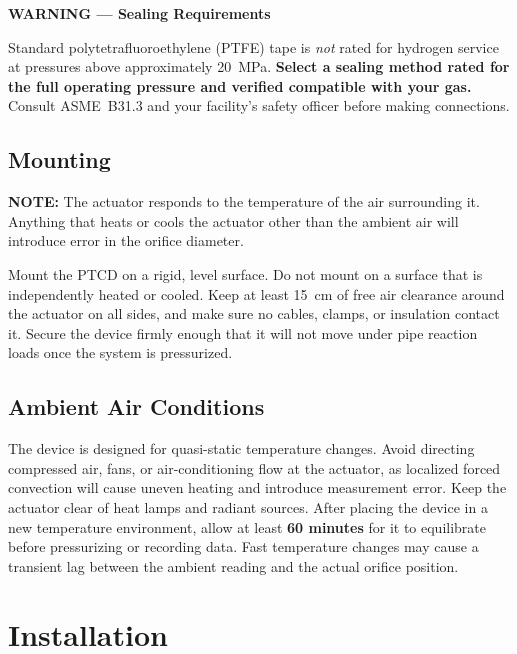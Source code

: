\documentclass[12pt, letterpaper]{report}%
\newcounter{mycounter}           %
\newcounter{sub}[mycounter]      %
\begin{document}
\begin{appendices}
	\begin{warningbox}
	\textbf{\textcolor{warnred}{WARNING --- Sealing Requirements}}

	Standard polytetrafluoroethylene (PTFE) tape is \emph{not} rated for hydrogen service at pressures above approximately \SI{20}{\mega\pascal}. \textbf{Select a sealing method rated for the full operating pressure and verified compatible with your gas.} Consult ASME~B31.3 and your facility's safety officer before making connections.
	\end{warningbox}

	\subsection{Mounting}
	\label{sec:mounting}
	\textbf{NOTE:} The actuator responds to the temperature of the air surrounding it. Anything that heats or cools the actuator other than the ambient air will introduce error in the orifice diameter.

	Mount the PTCD on a rigid, level surface. Do not mount on a surface that is independently heated or cooled. Keep at least \SI{15}{\centi\meter} of free air clearance around the actuator on all sides, and make sure no cables, clamps, or insulation contact it. Secure the device firmly enough that it will not move under pipe reaction loads once the system is pressurized.

	\subsection{Ambient Air Conditions}

	The device is designed for quasi-static temperature changes. Avoid directing compressed air, fans, or air-conditioning flow at the actuator, as localized forced convection will cause uneven heating and introduce measurement error. Keep the actuator clear of heat lamps and radiant sources. After placing the device in a new temperature environment, allow at least \textbf{60 minutes} for it to equilibrate before pressurizing or recording data. Fast temperature changes may cause a transient lag between the ambient reading and the actual orifice position.

	\section{Installation}


\end{appendices}
\end{document}
